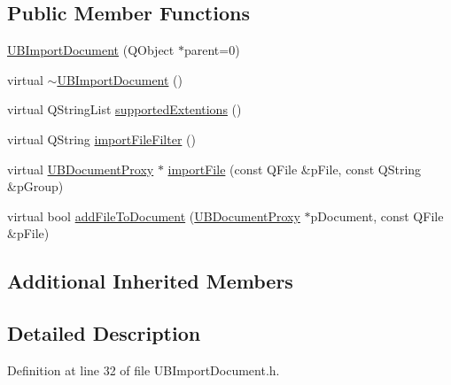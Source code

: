 \subsection*{Public Member Functions}
\begin{DoxyCompactItemize}
\item 
\hyperlink{class_u_b_import_document_ac58ecd1d0f1fe75221c325a10b1e716a}{U\-B\-Import\-Document} (Q\-Object $\ast$parent=0)
\item 
virtual \hyperlink{class_u_b_import_document_aee5984aa38a88686b1ba9beb66dda94d}{$\sim$\-U\-B\-Import\-Document} ()
\item 
virtual Q\-String\-List \hyperlink{class_u_b_import_document_abd9ab1bf89afddf021b92ceb817f1730}{supported\-Extentions} ()
\item 
virtual Q\-String \hyperlink{class_u_b_import_document_a87d1a7102a1b83e7d5f77c07272378d4}{import\-File\-Filter} ()
\item 
virtual \hyperlink{class_u_b_document_proxy}{U\-B\-Document\-Proxy} $\ast$ \hyperlink{class_u_b_import_document_a8678037c772af1ff6e3cea1256e64c2e}{import\-File} (const Q\-File \&p\-File, const Q\-String \&p\-Group)
\item 
virtual bool \hyperlink{class_u_b_import_document_a6af34839dc8c31633ab49270c4b8a434}{add\-File\-To\-Document} (\hyperlink{class_u_b_document_proxy}{U\-B\-Document\-Proxy} $\ast$p\-Document, const Q\-File \&p\-File)
\end{DoxyCompactItemize}
\subsection*{Additional Inherited Members}


\subsection{Detailed Description}


Definition at line 32 of file U\-B\-Import\-Document.\-h.



